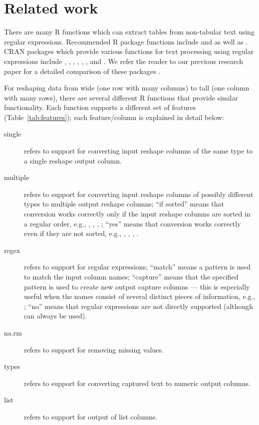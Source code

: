 \section{Related work}

There are many R functions which can extract tables from non-tabular
text using regular expressions. Recommended R package functions
include  and  as well as
. CRAN packages which provide various
functions for text processing using regular expressions include
 \citep{namedCapture}, 
\citep{rematch2},  \citep{rex}, 
\citep{stringr},  \citep{stringi}, 
\citep{tidyr}, and  \citep{re2r}.  We refer the reader
to our previous research paper for a detailed comparison of these
packages \citep{HOCKING2019-namedCapture}.

For reshaping data from wide (one row with many columns) to tall (one
column with many rows), there are several different R functions that
provide similar functionality. Each function supports a different set
of features (Table~\ref{tab:features}); each feature/column is
explained in detail below:
\begin{description}
\item[single] refers to support for converting input reshape columns
  of the same type to a single reshape output column.
\item[multiple] refers to support for converting input reshape columns of
  possibly different types to multiple output reshape columns; ``if sorted''
  means that conversion works correctly only if the input reshape columns are sorted
  in a regular order, e.g., , ,
  , ; ``yes'' means that
  conversion works correctly even if they are not sorted,
  e.g., , , ,
  .
\item[regex] refers to support for regular expressions; ``match''
  means a pattern is used to match the input column names; ``capture''
  means that the specified pattern is used to
  create new output capture columns --- this is especially useful when the names
  consist of several distinct pieces of information, e.g., ;
  ``no'' means that regular expressions are not directly supported
  (although  can always be used).
\item[na.rm] refers to support for removing missing values.
\item[types] refers to support for converting captured text to numeric
  output columns.
\item[list] refers to support for output of list columns.
\end{description}


